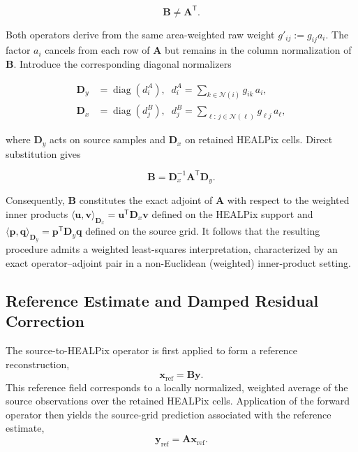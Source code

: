 \documentclass[journal]{IEEEtran}
\newcommand{\healpix}{HEALPix\xspace}
\begin{document}
\begin{equation}
\mathbf{B}\neq\mathbf{A}^{\mathsf T}.
\label{eq:not_adjoint}
\end{equation}

Both operators derive from the same area-weighted raw weight
$g'_{ij}:=g_{ij}a_i$. The factor $a_i$ cancels from each row of
$\mathbf A$ but remains in the column normalization of $\mathbf B$.
Introduce the corresponding diagonal normalizers

\begin{equation}
\begin{split}
\mathbf{D}_y&=\operatorname{diag}\!\left(d^{A}_i\right),\;\;
d^{A}_i=\sum_{k\in\mathcal N(i)}g_{ik}\,a_i,\\
\mathbf{D}_x&=\operatorname{diag}\!\left(d^{B}_j\right),\;\;
d^{B}_j=\!\!\sum_{\ell:\,j\in\mathcal N(\ell)}\!\!g_{\ell j}\,a_\ell,
\end{split}
\label{eq:dxdy}
\end{equation}

where $\mathbf D_y$ acts on source samples and $\mathbf D_x$ on
retained \healpix cells. Direct substitution gives

\begin{equation}
\mathbf{B}=\mathbf{D}_x^{-1}\mathbf{A}^{\mathsf T}\mathbf{D}_y.
\label{eq:weighted_adjoint}
\end{equation}

Consequently, $\mathbf B$ constitutes the exact adjoint of $\mathbf A$ with respect to the weighted inner products
$\langle\mathbf u,\mathbf v\rangle_{\mathbf D_x}
=\mathbf u^{\mathsf T}\mathbf D_x\mathbf v$ defined on the \healpix support and
$\langle\mathbf p,\mathbf q\rangle_{\mathbf D_y}
=\mathbf p^{\mathsf T}\mathbf D_y\mathbf q$ defined on the source grid. It follows that the resulting procedure admits a weighted least-squares interpretation, characterized by an exact operator–adjoint pair in a non-Euclidean (weighted) inner-product setting.

\subsection{Reference Estimate and Damped Residual Correction}

The source-to-\healpix operator is first applied to form a reference reconstruction,
\begin{equation}
\mathbf{x}_{\mathrm{ref}}
=
\mathbf{B}\mathbf{y}.
\label{eq:xref}
\end{equation}
This reference field corresponds to a locally normalized, weighted average of the source observations over the retained \healpix cells. Application of the forward operator then yields the source-grid prediction associated with the reference estimate,
\begin{equation}
\mathbf{y}_{\mathrm{ref}}
=
\mathbf{A}\mathbf{x}_{\mathrm{ref}}.
\end{equation}
\end{document}
